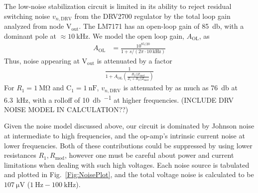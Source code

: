 \documentclass[aip,rsi,reprint]{revtex4-1} %
\begin{document}
The low-noise stabilization circuit is limited in its ability to reject residual switching noise $v_{n,\text{DRV}}$ from the DRV2700 regulator by the total loop gain analyzed from node $\text{V}_\text{out}$.
The LM7171 has an open-loop gain of \SI{85}{\decibel}, with a dominant pole at $\approx\SI{10}{\kilo\hertz}$.
We model the open loop gain, $A_\text{OL}$, as
\begin{align}
A_\text{OL} &= \frac{10^{85/20}}{1+s/(2\pi\cdot\SI{10}{\kilo\hertz})}
\end{align}
Thus, noise appearing at $\text{V}_\text{out}$ is attenuated by a factor
\begin{align}
\frac{1}{1+A_\text{OL}\left(\frac{R_2||Z_\text{mod}}{Z_1 + R_2||Z_\text{mod}}\right)}
\end{align}
For $R_1=\SI{1}{\mega\ohm}$ and $\text{C}_1 = \SI{1}{\nano\farad}$, $v_{n,\text{DRV}}$ is attenuated by as much as \SI{76}{\decibel} at \SI{6.3}{\kilo\hertz}, with a rolloff of \SI[per-mode=symbol]{10}{\decibel\per{}} at higher frequencies.
(INCLUDE DRV NOISE MODEL IN CALCULATION??)


Given the noise model discussed above, our circuit is dominated by Johnson noise at intermediate to high frequencies, and the op-amp's intrinsic current noise at lower frequencies.
Both of these contributions could be suppressed by using lower resistances $R_1, R_\text{mod}$, however one must be careful about power and current limitations when dealing with such high voltages.
Each noise source is tabulated and plotted in Fig.~\ref{Fig:NoisePlot}, and the total voltage noise  is calculated to be $\SI{107}{\micro\volt}$ ($\SI{1}{\hertz} - \SI{100}{\kilo\hertz}$).
\end{document}
